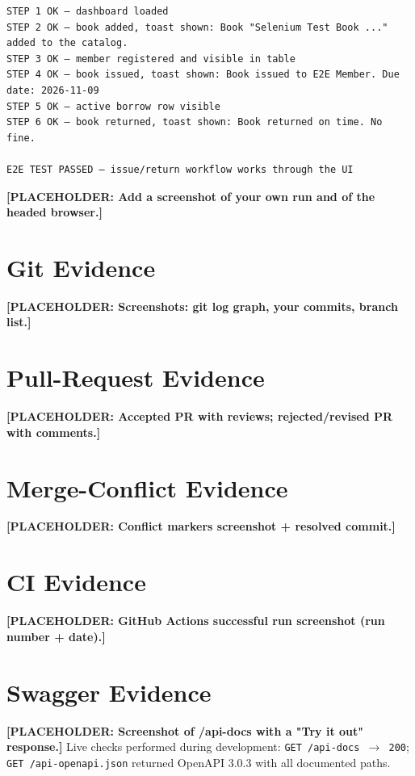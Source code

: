 \documentclass[12pt,a4paper]{article}
\newcommand{\placeholder}[1]{\textbf{[PLACEHOLDER: #1]}}
\begin{document}
\begin{lstlisting}[language={},caption={e2e run (recorded)}]
STEP 1 OK — dashboard loaded
STEP 2 OK — book added, toast shown: Book "Selenium Test Book ..." added to the catalog.
STEP 3 OK — member registered and visible in table
STEP 4 OK — book issued, toast shown: Book issued to E2E Member. Due date: 2026-11-09
STEP 5 OK — active borrow row visible
STEP 6 OK — book returned, toast shown: Book returned on time. No fine.

E2E TEST PASSED — issue/return workflow works through the UI
\end{lstlisting}

\placeholder{Add a screenshot of your own run and of the headed browser.}

\section{Git Evidence}
\label{app:git}
\placeholder{Screenshots: git log graph, your commits, branch list.}

\section{Pull-Request Evidence}
\label{app:pr}
\placeholder{Accepted PR with reviews; rejected/revised PR with comments.}

\section{Merge-Conflict Evidence}
\label{app:conflict}
\placeholder{Conflict markers screenshot + resolved commit.}

\section{CI Evidence}
\label{app:ci}
\placeholder{GitHub Actions successful run screenshot (run number + date).}

\section{Swagger Evidence}
\label{app:swagger}
\placeholder{Screenshot of /api-docs with a "Try it out" response.}
Live checks performed during development: \texttt{GET /api-docs $\rightarrow$
200}; \texttt{GET /api-openapi.json} returned OpenAPI 3.0.3 with all
documented paths.
\end{document}

